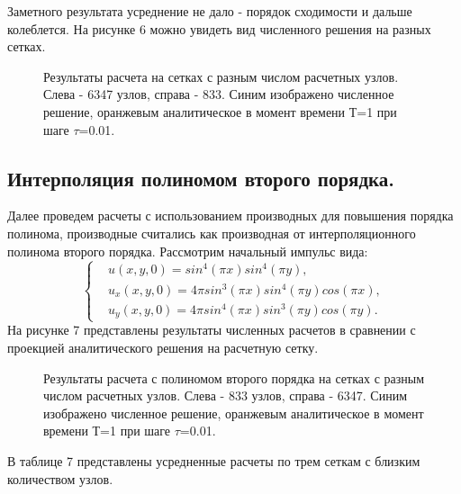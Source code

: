 \documentclass[14pt]{article}
\begin{document}
\newpage
Заметного результата усреднение не дало - порядок сходимости и дальше колеблется. На рисунке 6 можно увидеть вид численного решения на разных сетках.
\begin{figure}[!h!]
\caption{Результаты расчета на сетках с разным числом расчетных узлов. Слева - 6347 узлов, справа - 833. Синим изображено численное решение, оранжевым аналитическое в момент времени Т=1 при шаге $\tau$=0.01.}
\end{figure}
\subsection{Интерполяция полиномом второго порядка.}
Далее проведем расчеты с использованием производных для повышения порядка полинома, производные считались как производная от интерполяционного полинома второго порядка. Рассмотрим начальный импульс вида:
\begin{equation}
\left\lbrace
\begin{aligned}
&u(x,y,0) = sin^4(\pi x)sin^4(\pi y),\\
&u_x(x,y,0) =  4\pi sin^3(\pi x) sin^4(\pi y)  cos(\pi x),\\
&u_y(x,y,0) = 4\pi sin^4(\pi x)sin^3(\pi y)cos(\pi y).
\end{aligned}
\right .
\end{equation}
На рисунке 7 представлены результаты численных расчетов в сравнении с проекцией аналитического решения на расчетную сетку.
\begin{figure}[!h!]
\caption{Результаты расчета с полиномом второго порядка на сетках с разным числом расчетных узлов. Слева - 833 узлов, справа - 6347. Синим изображено численное решение, оранжевым аналитическое в момент времени Т=1 при шаге $\tau$=0.01.}
\end{figure}
 В таблице 7 представлены усредненные расчеты по трем сеткам с близким количеством узлов.
\end{document}
